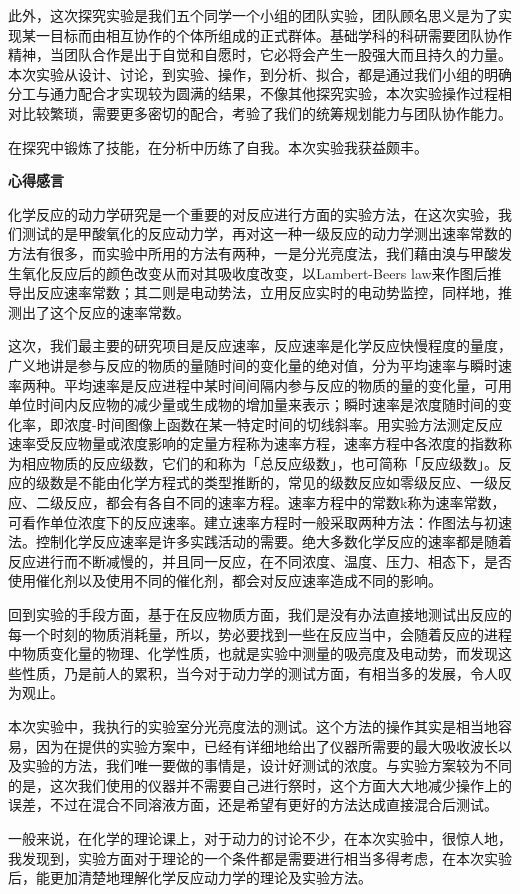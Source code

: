 \documentclass[%
preprint,
 amsmath,amssymb,
 aps,
10.5pt,
]{revtex4-1}
\newcommand{\xiaosan}{\fontsize{15pt}{22pt}\selectfont}    %
\newcommand{\xiaosi}{\fontsize{12pt}{18pt}\selectfont}
\begin{document}
此外，这次探究实验是我们五个同学一个小组的团队实验，团队顾名思义是为了实现某一目标而由相互协作的个体所组成的正式群体。基础学科的科研需要团队协作精神，当团队合作是出于自觉和自愿时，它必将会产生一股强大而且持久的力量。本次实验从设计、讨论，到实验、操作，到分析、拟合，都是通过我们小组的明确分工与通力配合才实现较为圆满的结果，不像其他探究实验，本次实验操作过程相对比较繁琐，需要更多密切的配合，考验了我们的统筹规划能力与团队协作能力。

在探究中锻炼了技能，在分析中历练了自我。本次实验我获益颇丰。

\newpage
\begin{center}
\xiaosan\textbf{心得感言}

\xiaosi{吴冠履 （3160100087）}
\end{center}
化学反应的动力学研究是一个重要的对反应进行方面的实验方法，在这次实验，我们测试的是甲酸氧化的反应动力学，再对这一种一级反应的动力学测出速率常数的方法有很多，而实验中所用的方法有两种，一是分光亮度法，我们藉由溴与甲酸发生氧化反应后的颜色改变从而对其吸收度改变，以Lambert-Beers law来作图后推导出反应速率常数；其二则是电动势法，立用反应实时的电动势监控，同样地，推测出了这个反应的速率常数。

这次，我们最主要的研究项目是反应速率，反应速率是化学反应快慢程度的量度，广义地讲是参与反应的物质的量随时间的变化量的绝对值，分为平均速率与瞬时速率两种。平均速率是反应进程中某时间间隔内参与反应的物质的量的变化量，可用单位时间内反应物的减少量或生成物的增加量来表示；瞬时速率是浓度随时间的变化率，即浓度-时间图像上函数在某一特定时间的切线斜率。用实验方法测定反应速率受反应物量或浓度影响的定量方程称为速率方程，速率方程中各浓度的指数称为相应物质的反应级数，它们的和称为「总反应级数」，也可简称「反应级数」。反应的级数是不能由化学方程式的类型推断的，常见的级数反应如零级反应、一级反应、二级反应，都会有各自不同的速率方程。速率方程中的常数k称为速率常数，可看作单位浓度下的反应速率。建立速率方程时一般采取两种方法：作图法与初速法。控制化学反应速率是许多实践活动的需要。绝大多数化学反应的速率都是随着反应进行而不断减慢的，并且同一反应，在不同浓度、温度、压力、相态下，是否使用催化剂以及使用不同的催化剂，都会对反应速率造成不同的影响。

回到实验的手段方面，基于在反应物质方面，我们是没有办法直接地测试出反应的每一个时刻的物质消耗量，所以，势必要找到一些在反应当中，会随着反应的进程中物质变化量的物理、化学性质，也就是实验中测量的吸亮度及电动势，而发现这些性质，乃是前人的累积，当今对于动力学的测试方面，有相当多的发展，令人叹为观止。

本次实验中，我执行的实验室分光亮度法的测试。这个方法的操作其实是相当地容易，因为在提供的实验方案中，已经有详细地给出了仪器所需要的最大吸收波长以及实验的方法，我们唯一要做的事情是，设计好测试的浓度。与实验方案较为不同的是，这次我们使用的仪器并不需要自己进行祭时，这个方面大大地减少操作上的误差，不过在混合不同溶液方面，还是希望有更好的方法达成直接混合后测试。

一般来说，在化学的理论课上，对于动力的讨论不少，在本次实验中，很惊人地，我发现到，实验方面对于理论的一个条件都是需要进行相当多得考虑，在本次实验后，能更加清楚地理解化学反应动力学的理论及实验方法。
\end{document}
